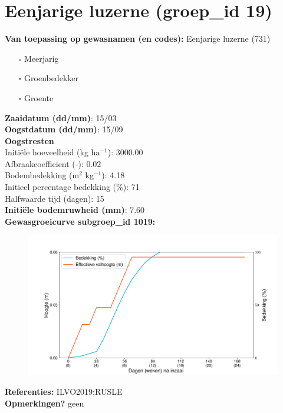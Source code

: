 \documentclass{article}
\begin{document}
 \section{Eenjarige luzerne (groep\_id 19)} 
 \textbf{Van toepassing op gewasnamen (en codes):} Eenjarige luzerne (731) 
 \begin{multicols}{3} \begin{itemize} \item[$\square$] Meerjarig \item[$\square$] Groenbedekker \item[$\square$] Groente \end{itemize} \end{multicols} 
  \textbf{Zaaidatum (dd/mm)}: 15/03  \vspace{0.10cm} \\ 
  \textbf{Oogstdatum (dd/mm)}: 15/09  \vspace{0.10cm} \\ 
  \textbf{Oogstresten} \vspace{0.05cm} \\ 
  \tab Initi\"{e}le hoeveelheid (kg ha$^{-1}$): 3000.00 \vspace{0.05cm} \\ 
  \tab Afbraakcoefficient (-): 0.02 \vspace{0.05cm} \\ 
  \tab Bodembedekking (m$^2$ kg$^{-1}$): 4.18 \vspace{0.05cm} \\ 
  \tab Initieel percentage bedekking (\%): 71 \vspace{0.05cm} \\ 
  \tab Halfwaarde tijd (dagen): 15 \vspace{0.05cm} \\ 
  \textbf{Initi\"{e}le bodemruwheid (mm)}: 7.60 \vspace{0.05cm} \\ 
  \textbf{Gewasgroeicurve subgroep\_id 1019:} 
 \begin{center} \begin{figure}[H] \includegraphics[width=12.5cm]{temp/1019.png} \end{figure} \end{center} 
  \textbf{Referenties:} ILVO2019;RUSLE \vspace{0.10cm} \\ 
  \textbf{Opmerkingen?} geen \vspace{0.10cm} \\ 
 \newpage 
\end{document}
